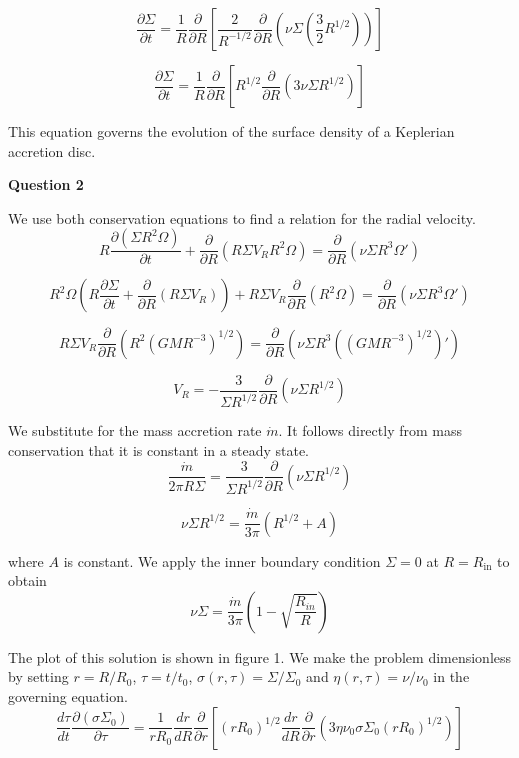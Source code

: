 \documentclass[12pt]{extarticle}
\begin{document}
$$\frac{\partial \Sigma}{\partial t}=\frac{1}{R}\frac{\partial}{\partial R}\left[\frac{2}{R^{-1/2}}\frac{\partial }{\partial R}\left(\nu \Sigma \left(\frac{3}{2}R^{1/2}\right)\right) \right]$$

$$\frac{\partial \Sigma}{\partial t}=\frac{1}{R}\frac{\partial}{\partial R}\left[R^{1/2}\frac{\partial }{\partial R}(3\nu \Sigma R^{1/2}) \right]$$

This equation governs the evolution of the surface density of a Keplerian accretion disc.\\

\begin{center}
\textbf{Question 2}
\end{center}

We use both conservation equations to find a relation for the radial velocity.
$$R\frac{\partial(\Sigma R^2\Omega)}{\partial t}+\frac{\partial}{\partial R}(R\Sigma V_R R^2 \Omega) = \frac{\partial}{\partial R}(\nu \Sigma R^3 \Omega ')$$

$$R^2 \Omega \left(R\frac{\partial \Sigma}{\partial t}+\frac{\partial}{\partial R}(R\Sigma V_R)\right)+R\Sigma V_R\frac{\partial}{\partial R}(R^2 \Omega)  = \frac{\partial}{\partial R}(\nu \Sigma R^3 \Omega ')$$

$$R\Sigma V_R\frac{\partial}{\partial R}(R^2 (GMR^{-3})^{1/2})  = \frac{\partial}{\partial R}\left(\nu \Sigma R^3 ((GMR^{-3})^{1/2})'\right)$$

$$V_R = -\frac{3}{\Sigma R^{1/2}}\frac{\partial}{\partial R}(\nu \Sigma R^{1/2})$$

We substitute for the mass accretion rate $\dot{m}$. It follows directly from mass conservation that it is constant in a steady state.
$$ \frac{\dot{m}}{2\pi R\Sigma} = \frac{3}{\Sigma R^{1/2}}\frac{\partial}{\partial R}(\nu \Sigma R^{1/2})$$

$$\nu \Sigma R^{1/2} = \frac{\dot{m}}{3\pi}(R^{1/2}+A)$$

where $A$ is constant. We apply the inner boundary condition $\Sigma = 0$ at $R = R_{\mathrm{in}}$ to obtain
$$\nu \Sigma = \frac{\dot{m}}{3\pi}\left(1-\sqrt{\frac{R_{in}}{R}}\right)$$

The plot of this solution is shown in figure 1. We make the problem dimensionless by setting $r = R/R_0$, $\tau = t/t_0$, $\sigma (r,\tau) = \Sigma/\Sigma_0$ and $\eta (r,\tau) = \nu/\nu_0$ in the governing equation.
$$\frac{d\tau}{dt}\frac{\partial (\sigma \Sigma_0)}{\partial \tau}=\frac{1}{rR_0}\frac{dr}{dR}\frac{\partial}{\partial r}\left[(rR_0)^{1/2}\frac{dr}{dR}\frac{\partial }{\partial r}(3\eta\nu_0 \sigma \Sigma_0 (rR_0)^{1/2}) \right]$$
\end{document}
